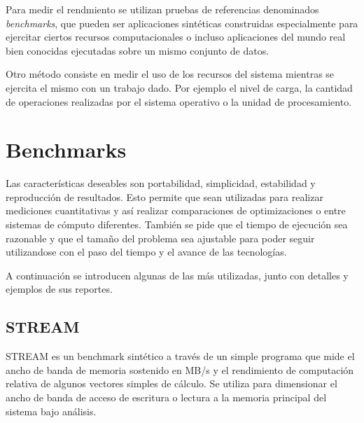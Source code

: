 \documentclass[a4paper]{report}
\begin{document}
Para medir el rendmiento se utilizan pruebas de referencias denominados {\em benchmarks}, que pueden ser aplicaciones
sint\'eticas construidas especialmente para ejercitar ciertos recursos computacionales o incluso aplicaciones del
 mundo real bien conocidas ejecutadas sobre un mismo conjunto de datos.

\bigskip

Otro m\'etodo consiste en medir el uso de los recursos del sistema mientras se ejercita el mismo con un trabajo dado.
Por ejemplo el nivel de carga, la cantidad de operaciones realizadas por el sistema operativo o la unidad de
procesamiento.

\section{Benchmarks}

Las caracter\'isticas deseables son portabilidad, simplicidad, estabilidad y reproducci\'on de resultados.
Esto permite que sean utilizadas para realizar mediciones cuantitativas y as\'i realizar comparaciones de
optimizaciones o entre sistemas de c\'omputo diferentes.
Tambi\'en se pide que el tiempo de ejecuci\'on sea razonable y que el tama\~no del problema sea ajustable para poder
seguir utilizandose con el paso del tiempo y el avance de las tecnolog\'ias.

\bigskip

A continuaci\'on se introducen algunas de las m\'as utilizadas, junto con detalles y ejemplos de sus reportes.

\subsection{STREAM}

STREAM \cite{stream} es un benchmark sint\'etico a trav\'es de un simple programa que mide el ancho de banda de
memoria sostenido en MB/s y el rendimiento de computaci\'on relativa de algunos vectores simples de c\'alculo.
Se utiliza para dimensionar el ancho de banda de acceso de escritura o lectura a la memoria principal del sistema
 bajo an\'alisis.
\end{document}
